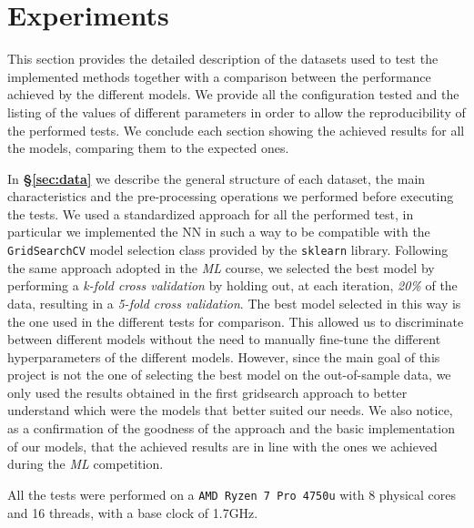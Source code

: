 \section{Experiments}
This section provides the detailed description of the datasets used to test the implemented methods together with a comparison between the performance achieved by the different models. We provide all the configuration tested and the listing of the values of different parameters in order to allow the reproducibility of the performed tests. We conclude each section showing the achieved results for all the models, comparing them to the expected ones.

In \textbf{\S\ref{sec:data}} we describe the general structure of each dataset, the main characteristics and the pre-processing operations we performed before executing the tests. We used a standardized approach for all the performed test, in particular we implemented the NN in such a way to be compatible with the \texttt{GridSearchCV} model selection class provided by the \texttt{sklearn} library. Following the same approach adopted in the \textit{ML} course, we selected the best model by performing a \textit{k-fold cross validation} by holding out, at each iteration, \textit{20\%} of the data, resulting in a \textit{5-fold cross validation}. The best model selected in this way is the one used in the different tests for comparison. This allowed us to discriminate between different models without the need to manually fine-tune the different hyperparameters of the different models. However, since the main goal of this project is not the one of selecting the best model on the out-of-sample data, we only used the results obtained in the first gridsearch approach to better understand which were the models that better suited our needs. We also notice, as a confirmation of the goodness of the approach and the basic implementation of our models, that the achieved results are in line with the ones we achieved during the \textit{ML} competition.

All the tests were performed on a \texttt{AMD Ryzen 7 Pro 4750u} with 8 physical cores and 16 threads, with a base clock of 1.7GHz.







